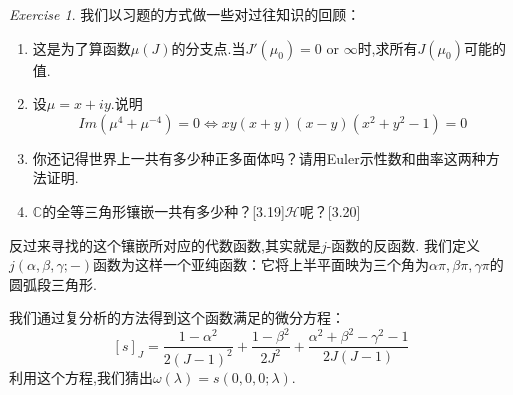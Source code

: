 \documentclass[12pt,A4paper,oneside]{amsart}
\numberwithin{equation}{section}
\theoremstyle{plain}
\theoremstyle{plain}
\theoremstyle{plain}
\numberwithin{equation}{section}
\theoremstyle{remark}
\newtheorem{ex}[theorem]{Exercise}
\begin{document}
\begin{ex}
我们以习题的方式做一些对过往知识的回顾：
\begin{enumerate}
	\item 这是为了算函数$\mu(J)$的分支点.当$J'(\mu_0)=0$ or $\infty$时,求所有$J(\mu_0)$可能的值.
	\item 设$\mu=x+iy$.说明$$Im (\mu^4+\mu^{-4}) =0 \Longleftrightarrow xy(x+y)(x-y)(x^2+y^2-1)=0$$
	\item 你还记得世界上一共有多少种正多面体吗？请用Euler示性数和曲率这两种方法证明.
	\item $\mathbb{C}$的全等三角形镶嵌一共有多少种？[3.19]$\mathcal{H}$呢？[3.20]
\end{enumerate}
\end{ex}
反过来寻找的这个镶嵌所对应的代数函数,其实就是$j$-函数的反函数.
我们定义$j(\alpha,\beta,\gamma;-)$函数为这样一个亚纯函数：它将上半平面映为三个角为$\alpha \pi,\beta \pi, \gamma\pi$的圆弧段三角形.

我们通过复分析的方法得到这个函数满足的微分方程：
$$[s]_J=\frac{1-\alpha^2}{2(J-1)^2}+\frac{1-\beta^2}{2J^2}+\frac{\alpha^2+\beta^2-\gamma^2-1}{2J(J-1)}$$
利用这个方程,我们猜出$\omega(\lambda)=s(0,0,0;\lambda)$.
\end{document}
